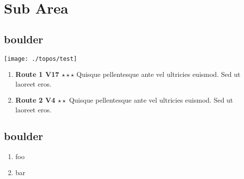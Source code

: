 \chapter{Sub Area}
\lhead{\textcolor{\chapterColor}{\rule[-2pt]{\textwidth}{15pt}}}
\lipsum[2]

\section{boulder}
\begin{figure*}[h]
\texttt{[image: ./topos/test]}
\centering
\end{figure*}
\lipsum[1]
\begin{enumerate}
\item \textbf{Route 1 V17 $\star\star\star$} \newline Quisque pellentesque ante vel ultricies euismod. Sed ut laoreet eros. 
\item \textbf{Route 2 V4 $\star\star$} \newline Quisque pellentesque ante vel ultricies euismod. Sed ut laoreet eros. 
\end{enumerate}

\section{boulder}
\lipsum[1]
\begin{enumerate}[resume]
\item foo
\item bar
\end{enumerate}
\clearpage